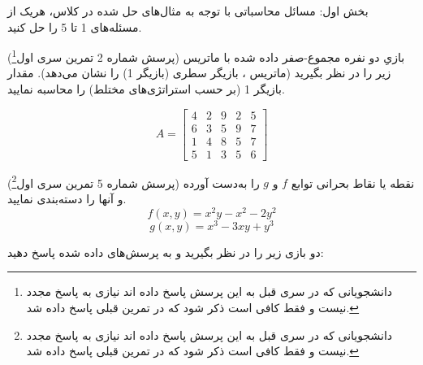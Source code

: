 \documentclass[12pt]{exam}
\theoremstyle{plain}
\theoremstyle{definition}
\theoremstyle{remark}
\begin{document}
\begin{mybox2}{بخش اول: مسائل محاسباتی}
	با توجه به مثال‌های حل شده در کلاس، هریک از مسئله‌های 1 تا 5 را حل کنید.
\end{mybox2}
\begin{questions}


\question
(پرسش شماره 2 تمرین سری اول\footnote{دانشجویانی که در سری قبل به این پرسش پاسخ داده ‌اند نیازی به پاسخ مجدد نیست و فقط کافی است ذکر شود که در تمرین قبلی پاسخ داده شد.}) 
بازیِ دو نفره مجموع-صفر داده شده با ماتریس
زیر را در نظر بگیرید
(ماتریس 
، 
بازیگر سطری (بازیگر 1) را نشان می‌دهد). مقدار
\textit{}
بازیگر 1 (بر حسب استراتژی‌های مختلط) را محاسبه نمایید.

\begin{equation*}
A = 
\begin{bmatrix}
4 & 2 & 9 & 2 & 5 \\
6 & 3 & 5 & 9 & 7 \\
1 & 4 & 8 & 5 & 7 \\
5 & 1 & 3 & 5 & 6 
\end{bmatrix}
\end{equation*}

\question
(پرسش شماره 5 تمرین سری اول\footnote{دانشجویانی که در سری قبل به این پرسش پاسخ داده ‌اند نیازی به پاسخ مجدد نیست و فقط کافی است ذکر شود که در تمرین قبلی پاسخ داده شد.}) 
نقطه یا نقاط بحرانی توابع $f$ و $g$ را به‌دست آورده و آنها را دسته‌بندی نمایید.
$$
f(x,y) = x^2y - x^2 - 2y^2
$$
$$
g(x,y) = x^3 -3xy + y^3
$$


\question
دو بازی زیر را در نظر بگیرید و به پرسش‌های  داده شده پاسخ دهید:


\end{questions}
\end{document}
